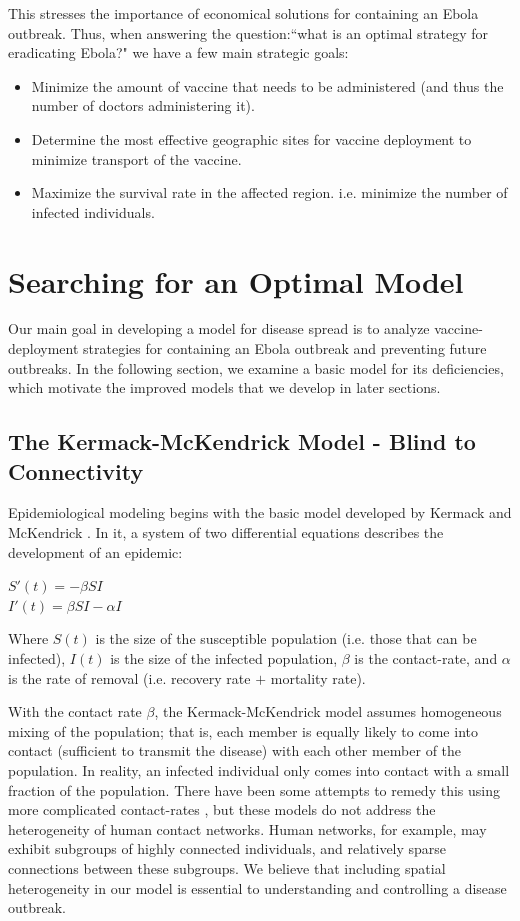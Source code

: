 \documentclass{article}
\begin{document}
This stresses the importance of economical solutions for containing an Ebola outbreak. Thus, when answering the question:``what is an optimal strategy for eradicating Ebola?" we have a few main strategic goals:
\begin{itemize}
\item Minimize the amount of vaccine that needs to be administered (and thus the number of doctors administering it).
\item Determine the most effective geographic sites for vaccine deployment to minimize transport of the vaccine.
\item Maximize the survival rate in the affected region. i.e. minimize the number of infected individuals.
\end{itemize}

\section{Searching for an Optimal Model}

Our main goal in developing a model for disease spread is to analyze vaccine-deployment strategies for containing an Ebola outbreak and preventing future outbreaks. In the following section, we examine a basic model for its deficiencies, which motivate the improved models that we develop in later sections.

\subsection{The Kermack-McKendrick Model - Blind to Connectivity}

Epidemiological modeling begins with the basic model developed by Kermack and McKendrick \cite{math_epid}. In it, a system of two differential equations describes the development of an epidemic: 
\begin{center}
$S'(t) = -\beta SI$
\\
$I'(t) = \beta SI - \alpha I$
\end{center}
Where $S(t)$ is the size of the susceptible population (i.e. those that can be infected), $I(t)$ is the size of the infected population, $\beta$ is the contact-rate, and $\alpha$ is the rate of removal (i.e. recovery rate $+$ mortality rate). 

With the contact rate $\beta$, the Kermack-McKendrick model assumes homogeneous mixing of the population; that is, each member is equally likely to come into contact (sufficient to transmit the disease) with each other member of the population. In reality, an infected individual only comes into contact with a small fraction of the population. There have been some attempts to remedy this using more complicated contact-rates \cite{math_epid}, but these models do not address the heterogeneity of human contact networks. Human networks, for example, may exhibit subgroups of highly connected individuals, and relatively sparse connections between these subgroups. We believe that including spatial heterogeneity in our model is essential to understanding and controlling a disease outbreak.
 
\end{document}
